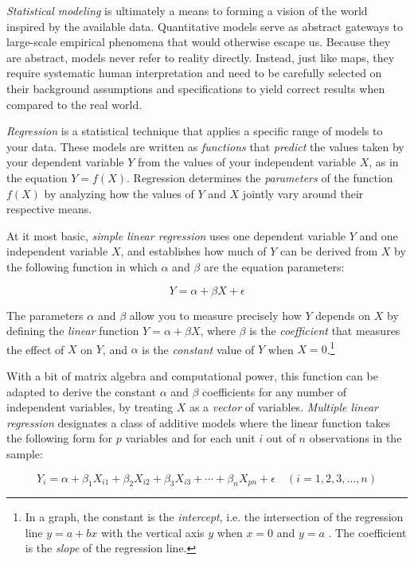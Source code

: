 \emph{Statistical modeling} is ultimately a means to forming a vision of the world inspired by the available data. Quantitative models serve as abstract gateways to large-scale empirical phenomena that would otherwise escape us. Because they are abstract, models never refer to reality directly. Instead, just like maps, they require systematic human interpretation and need to be carefully selected on their background assumptions and specifications to yield correct results when compared to the real world.

\emph{Regression} is a statistical technique that applies a specific range of models to your data. These models are written as \emph{functions} that \emph{predict} the values taken by your dependent variable $Y$ from the values of your independent variable $X$, as in the equation $Y = f(X)$. Regression determines the \emph{parameters} of the function $f(X)$ by analyzing how the values of $Y$ and $X$ jointly vary around their respective means.

At it most basic, \emph{simple linear regression} uses one dependent variable $Y$ and one independent variable $X$, and establishes how much of $Y$ can be derived from $X$ by the following function in which $\alpha$ and $\beta$ are the equation parameters:

$$Y = \alpha + \beta X + \epsilon$$%

The parameters $\alpha$ and $\beta$ allow you to measure precisely how $Y$ depends on $X$ by defining the \emph{linear} function $Y = \alpha + \beta X$, where $\beta$ is the \emph{coefficient} that measures the effect of $X$ on $Y$, and $\alpha$ is the \emph{constant} value of $Y$ when $X = 0$.\footnote{In a graph, the constant is the \emph{intercept}, i.e. the intersection of the regression line $y = a + bx$ with the vertical axis $y$ when $x = 0$ and $y = a$ . The coefficient is the \emph{slope} of the regression line.}

With a bit of matrix algebra and computational power, this function can be adapted to derive the constant $\alpha$ and $\beta$ coefficients for any number of independent variables, by treating $X$ as a \emph{vector} of variables. \emph{Multiple linear regression} designates a class of additive models where the linear function takes the following form for $p$ variables and for each unit $i$ out of $n$ observations in the sample:

$$Y_i = \alpha + \beta_1 X_{i1} + \beta_2 X_{i2} + \beta_3 X_{i3} + \cdots + \beta_n X_{pn} + \epsilon \quad (i = 1, 2, 3, \ldots, n) $$ %

